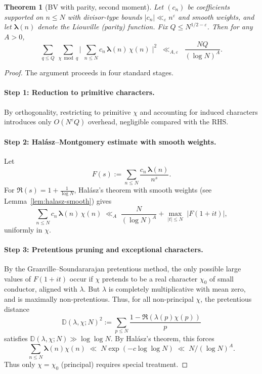 \documentclass[11pt]{article}
\newcommand{\liou}{\boldsymbol{\lambda}} %
\newtheorem{theorem}[lemma]{Theorem}
\theoremstyle{definition}
\theoremstyle{remark}
\numberwithin{equation}{part}
\begin{document}
\begin{theorem}[BV with parity, second moment]\label{thm:BVP2M}
	Let $(c_n)$ be coefficients supported on $n\le N$ with divisor-type bounds $|c_n|\ll_\varepsilon n^\varepsilon$ and smooth weights, and let $\liou(n)$ denote the Liouville (parity) function.
	Fix $Q\le N^{1/2-\varepsilon}$.
	Then for any $A>0$,
	\begin{equation}\label{eq:BVP2M-goal}
		\sum_{q\le Q}\ \sum_{\chi\bmod q}
		\Biggl|\;\sum_{n\le N} c_n\,\liou(n)\,\chi(n)\;\Biggr|^2
		\;\;\ll_{A,\varepsilon}\;\; \frac{NQ}{(\log N)^A}.
	\end{equation}
\end{theorem}

\begin{proof}
	The argument proceeds in four standard stages.

	\paragraph{Step 1: Reduction to primitive characters.}
	By orthogonality, restricting to primitive $\chi$ and accounting for induced characters introduces only $O(N^\varepsilon Q)$ overhead, negligible compared with the RHS.

	\paragraph{Step 2: Halász–Montgomery estimate with smooth weights.}
	Let
	\[
		F(s):=\sum_{n\le N} \frac{c_n\,\liou(n)}{n^s}.
	\]
	For $\Re(s)=1+\tfrac1{\log N}$, Halász’s theorem with smooth weights (see Lemma~\ref{lem:halasz-smooth}) gives
	\[
		\sum_{n\le N} c_n\,\liou(n)\,\chi(n)
		\;\ll_A\; \frac{N}{(\log N)^A}
		+ \max_{|t|\le N}\;\big|F(1+it)\big|,
	\]
	uniformly in $\chi$.

	\paragraph{Step 3: Pretentious pruning and exceptional characters.}
	By the Granville–Soundararajan pretentious method, the only possible large values of $F(1+it)$ occur if $\chi$ pretends to be a real character $\chi_0$ of small conductor, aligned with $\lambda$. But $\lambda$ is completely multiplicative with mean zero, and is maximally non-pretentious. Thus, for all non-principal $\chi$, the pretentious distance
	\[
		\mathbb D(\lambda,\chi;N)^2:=\sum_{p\le N}\frac{1-\Re(\lambda(p)\chi(p))}{p}
	\]
	satisfies $\mathbb D(\lambda,\chi;N)\gg\log\log N$.
	By Halász’s theorem, this forces
	\[
		\sum_{n\le N}\liou(n)\chi(n) \;\ll\; N\exp(-c\log\log N)\;\ll\; N/(\log N)^A.
	\]
	Thus only $\chi=\chi_0$ (principal) requires special treatment.


\end{proof}
\end{document}
